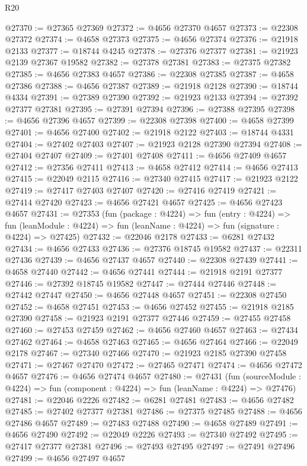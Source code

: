 \begin{lexlean}{R20}
\begin{coremodule}
@27370 := @27365 @27369
@27372 := @4656 @27370 @4657
@27373 := @22308 @27372
@27374 := @4658 @27373
@27375 := @4656 @27374
@27376 := @21918 @2133
@27377 := @18744 @4245
@27378 := @27376 @27377
@27381 := @21923 @2139 @27367 @19582
@27382 := @27378 @27381
@27383 := @27375 @27382
@27385 := @4656 @27383 @4657
@27386 := @22308 @27385
@27387 := @4658 @27386
@27388 := @4656 @27387
@27389 := @21918 @2128
@27390 := @18744 @4334
@27391 := @27389 @27390
@27392 := @21923 @2133
@27394 := @27392 @27377 @27381
@27395 := @27391 @27394
@27396 := @27388 @27395
@27398 := @4656 @27396 @4657
@27399 := @22308 @27398
@27400 := @4658 @27399
@27401 := @4656 @27400
@27402 := @21918 @2122
@27403 := @18744 @4331
@27404 := @27402 @27403
@27407 := @21923 @2128 @27390 @27394
@27408 := @27404 @27407
@27409 := @27401 @27408
@27411 := @4656 @27409 @4657
@27412 := @27356 @27411
@27413 := @4658 @27412
@27414 := @4656 @27413
@27415 := @22049 @2115
@27416 := @27340 @27415
@27417 := @21923 @2122
@27419 := @27417 @27403 @27407
@27420 := @27416 @27419
@27421 := @27414 @27420
@27423 := @4656 @27421 @4657
@27425 := @4656 @27423 @4657
@27431 := @27353
    (fun (package : @4224) =>
    fun (entry : @4224) =>
    fun (leanModule : @4224) => fun (leanName : @4224) => fun (signature : @4224) => @27425)
@27432 := @22046 @2178
@27433 := @6281 @27432
@27434 := @4656 @27433
@27436 := @27376 @18745 @19582
@27437 := @22311 @27436
@27439 := @4656 @27437 @4657
@27440 := @22308 @27439
@27441 := @4658 @27440
@27442 := @4656 @27441
@27444 := @21918 @2191 @27377
@27446 := @27392 @18745 @19582
@27447 := @27444 @27446
@27448 := @27442 @27447
@27450 := @4656 @27448 @4657
@27451 := @22308 @27450
@27452 := @4658 @27451
@27453 := @4656 @27452
@27455 := @21918 @2185 @27390
@27458 := @21923 @2191 @27377 @27446
@27459 := @27455 @27458
@27460 := @27453 @27459
@27462 := @4656 @27460 @4657
@27463 := @27434 @27462
@27464 := @4658 @27463
@27465 := @4656 @27464
@27466 := @22049 @2178
@27467 := @27340 @27466
@27470 := @21923 @2185 @27390 @27458
@27471 := @27467 @27470
@27472 := @27465 @27471
@27474 := @4656 @27472 @4657
@27476 := @4656 @27474 @4657
@27480 := @27431
    (fun (sourceModule : @4224) => fun (component : @4224) => fun (leanName : @4224) => @27476)
@27481 := @22046 @2226
@27482 := @6281 @27481
@27483 := @4656 @27482
@27485 := @27402 @27377 @27381
@27486 := @27375 @27485
@27488 := @4656 @27486 @4657
@27489 := @27483 @27488
@27490 := @4658 @27489
@27491 := @4656 @27490
@27492 := @22049 @2226
@27493 := @27340 @27492
@27495 := @27417 @27377 @27381
@27496 := @27493 @27495
@27497 := @27491 @27496
@27499 := @4656 @27497 @4657

\end{coremodule}
\end{lexlean}
